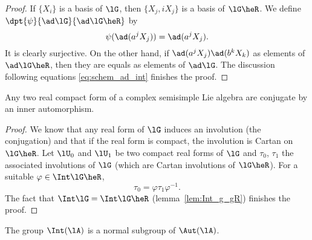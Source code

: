 \begin{proof}
If $\{X_i\}$ is a basis of $\lG$, then $\{X_j,iX_j\}$ is a basis of $\lG\heR$. We define $\dpt{\psi}{\ad\lG}{\ad\lG\heR}$ by
\[
   \psi(\ad(a^jX_j))=\ad(a^jX_j).
\]
It is clearly surjective. On the other hand, if $\ad(a^jX_j)\ad(b^kX_k)$ as elements of $\ad\lG\heR$, then they are equals as elements of $\ad\lG$. The discussion following equations \eqref{eq:schem_ad_int} finishes the proof.
\end{proof}

\begin{corollary}
Any two real compact form of a complex semisimple Lie algebra are conjugate by an inner automorphism.
\end{corollary}

\begin{proof}
    We know that any real form of $\lG$ induces an involution (the conjugation) and that if the real form is compact, the involution is Cartan on $\lG\heR$. Let $\lU_0$ and $\lU_1$ be two compact real forms of $\lG$ and $\tau_0$, $\tau_1$ the associated involutions of $\lG$ (which are Cartan involutions of $\lG\heR$). For a suitable $\varphi\in\Int\lG\heR$,
    \[
       \tau_0=\varphi\tau_1\varphi^{-1}.
    \]
    The fact that $\Int\lG=\Int\lG\heR$ (lemma~\ref{lem:Int_g_gR}) finishes the proof.
\end{proof}

\begin{proposition}
 The group $\Int(\lA)$ is a normal subgroup of $\Aut(\lA)$.
\end{proposition}

